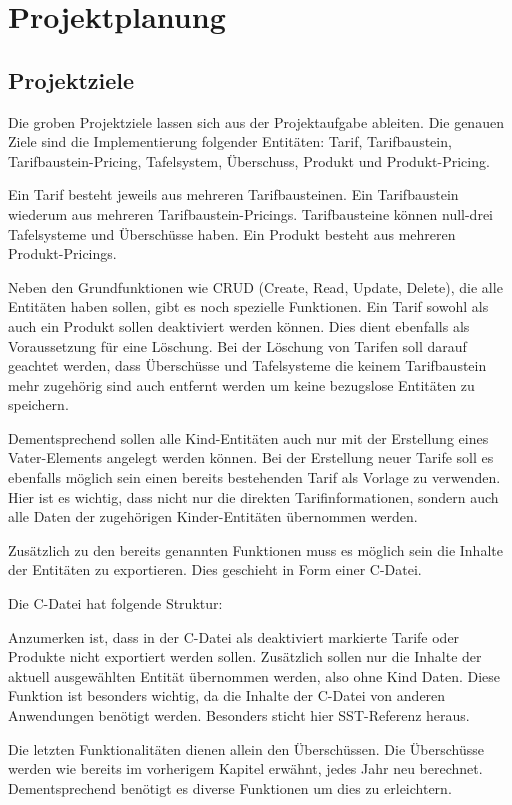 \chapter{Projektplanung}\label{ch:data}
\section{Projektziele}
Die groben Projektziele lassen sich aus der Projektaufgabe ableiten. 
Die genauen Ziele sind die Implementierung folgender Entitäten: Tarif, Tarifbaustein, Tarifbaustein-Pricing, Tafelsystem, Überschuss, Produkt und Produkt-Pricing.

Ein Tarif besteht jeweils aus mehreren Tarifbausteinen. Ein Tarifbaustein wiederum aus mehreren Tarifbaustein-Pricings. Tarifbausteine können null-drei Tafelsysteme und Überschüsse haben.
Ein Produkt besteht aus mehreren Produkt-Pricings. 

Neben den Grundfunktionen wie CRUD (Create, Read, Update, Delete), die alle Entitäten haben sollen, gibt es noch spezielle Funktionen.
Ein Tarif sowohl als auch ein Produkt sollen deaktiviert werden können. Dies dient ebenfalls als Voraussetzung für eine Löschung. Bei der Löschung von Tarifen soll darauf geachtet werden, dass Überschüsse und
Tafelsysteme die keinem Tarifbaustein mehr zugehörig sind auch entfernt werden um keine bezugslose Entitäten zu speichern. 

Dementsprechend sollen alle Kind-Entitäten auch nur mit der Erstellung eines Vater-Elements angelegt werden können.
Bei der Erstellung neuer Tarife soll es ebenfalls möglich sein einen bereits bestehenden Tarif als Vorlage zu verwenden. Hier ist es wichtig, dass nicht nur die direkten Tarifinformationen, 
sondern auch alle Daten der zugehörigen Kinder-Entitäten übernommen werden.

Zusätzlich zu den bereits genannten Funktionen muss es möglich sein 
die Inhalte der Entitäten zu exportieren. Dies geschieht in Form einer C-Datei. 

Die C-Datei hat folgende Struktur: 

Anzumerken ist, dass in der C-Datei als deaktiviert markierte Tarife oder Produkte nicht exportiert werden sollen. Zusätzlich sollen nur die Inhalte der aktuell ausgewählten Entität übernommen werden, also ohne Kind Daten.
Diese Funktion ist besonders wichtig, da die Inhalte der C-Datei von anderen Anwendungen benötigt werden. Besonders sticht hier SST-Referenz heraus.

Die letzten Funktionalitäten dienen allein den Überschüssen. Die Überschüsse werden wie bereits im vorherigem Kapitel erwähnt, jedes Jahr neu berechnet.
Dementsprechend benötigt es diverse Funktionen um dies zu erleichtern. 

